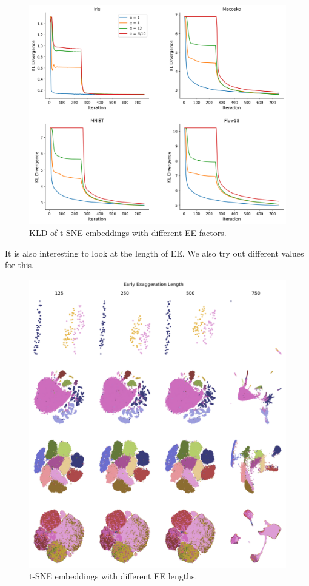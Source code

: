 \begin{figure}[h]
    \centering 
        \includegraphics[width=\linewidth]{../code/figures/alpha_kl_divergences_grid.png}
        \caption{KLD of t-SNE embeddings with different EE factors. }
    \label{fig:alpha_kld}
\end{figure}


It is also interesting to look at the length of EE. We also try out different values for this. 
\begin{figure}[h]
    \centering 
        \includegraphics[width=\linewidth]{../code/figures/ee_length_embedding_grid_tab20b.png}
        \caption{t-SNE embeddings with different EE lengths.}
    \label{fig:EE_length_grid}
\end{figure}


